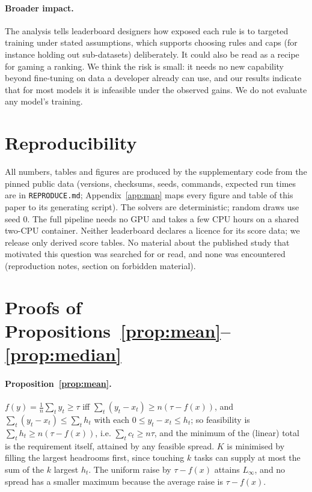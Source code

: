 \documentclass{article}
\begin{document}
\paragraph{Broader impact.}
The analysis tells leaderboard designers how exposed each rule is to targeted training under stated assumptions, which supports choosing rules and caps (for instance holding out sub-datasets) deliberately. It could also be read as a recipe for gaming a ranking. We think the risk is small: it needs no new capability beyond fine-tuning on data a developer already can use, and our results indicate that for most models it is infeasible under the observed gains. We do not evaluate any model's training.

\section{Reproducibility}
\label{sec:repro}
All numbers, tables and figures are produced by the supplementary code from the pinned public data (versions, checksums, seeds, commands, expected run times are in \texttt{REPRODUCE.md}; Appendix~\ref{app:map} maps every figure and table of this paper to its generating script). The solvers are deterministic; random draws use seed 0. The full pipeline needs no GPU and takes a few CPU hours on a shared two-CPU container. Neither leaderboard declares a licence for its score data; we release only derived score tables. No material about the published study that motivated this question was searched for or read, and none was encountered (reproduction notes, section on forbidden material).





\appendix
\section{Proofs of Propositions~\ref{prop:mean}--\ref{prop:median}}
\label{app:proofs}
\paragraph{Proposition~\ref{prop:mean}.} $f(y)=\frac1n\sum_t y_t\ge\tau$ iff $\sum_t(y_t-x_t)\ge n(\tau-f(x))$, and $\sum_t(y_t-x_t)\le\sum_t h_t$ with each $0\le y_t-x_t\le h_t$; so feasibility is $\sum_t h_t\ge n(\tau-f(x))$, i.e. $\sum_t c_t\ge n\tau$, and the minimum of the (linear) total is the requirement itself, attained by any feasible spread. $K$ is minimised by filling the largest headrooms first, since touching $k$ tasks can supply at most the sum of the $k$ largest $h_t$. The uniform raise by $\tau-f(x)$ attains $L_\infty$, and no spread has a smaller maximum because the average raise is $\tau-f(x)$.
\end{document}

